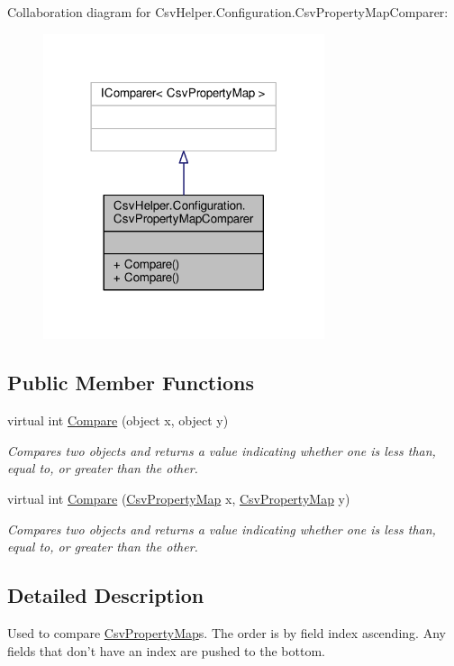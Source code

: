 Collaboration diagram for Csv\-Helper.\-Configuration.\-Csv\-Property\-Map\-Comparer\-:
\nopagebreak
\begin{figure}[H]
\begin{center}
\leavevmode
\includegraphics[width=234pt]{a00469}
\end{center}
\end{figure}
\subsection*{Public Member Functions}
\begin{DoxyCompactItemize}
\item 
virtual int \hyperlink{a00071_a41ab777503459b3984a2e2826a14d52a}{Compare} (object x, object y)
\begin{DoxyCompactList}\small\item\em Compares two objects and returns a value indicating whether one is less than, equal to, or greater than the other. \end{DoxyCompactList}\item 
virtual int \hyperlink{a00071_ab9c855cf5389c8f1ae1b476d508ade5d}{Compare} (\hyperlink{a00069}{Csv\-Property\-Map} x, \hyperlink{a00069}{Csv\-Property\-Map} y)
\begin{DoxyCompactList}\small\item\em Compares two objects and returns a value indicating whether one is less than, equal to, or greater than the other. \end{DoxyCompactList}\end{DoxyCompactItemize}


\subsection{Detailed Description}
Used to compare \hyperlink{a00069}{Csv\-Property\-Map}s. The order is by field index ascending. Any fields that don't have an index are pushed to the bottom. 



